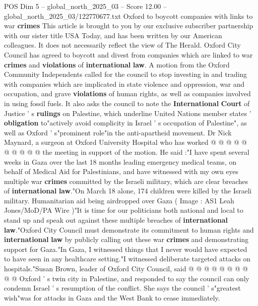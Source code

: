 \begin{textsample}{POS Dim 5 – global\_north\_2025\_03 – Score 12.00 – global\_north\_2025\_03/122770677.txt}  \label{ex:f5_pos_209}
Oxford to boycott companies with links to war \textbf{crimes} This article is brought to you by our exclusive subscriber partnership with our sister title USA Today, and has been written by our American colleagues.
It does not necessarily reflect the view of The Herald.
Oxford City Council has agreed to boycott and divest from companies which are linked to war \textbf{crimes} and \textbf{violations} of \textbf{international} \textbf{law}.
A motion from the Oxford Community Independents called for the council to stop investing in and trading with companies which are implicated in state violence and oppression, war and occupation, and grave \textbf{violations} of human rights, as well as companies involved in using fossil fuels.
It also asks the council to note the \textbf{International} \textbf{Court} of Justice ' s \textbf{rulings} on Palestine, which underline United Nations member states ' \textbf{obligation} to"actively avoid complicity in Israel ' s occupation of Palestine", as well as Oxford ' s"prominent role"in the anti-apartheid movement.
Dr Nick Maynard, a surgeon at Oxford University Hospital who has worked @ @ @ @ @ @ @ @ @ @ the meeting in support of the motion.
He said :"I have spent several weeks in Gaza over the last 18 months leading emergency medical teams, on behalf of Medical Aid for Palestinians, and have witnessed with my own eyes multiple war \textbf{crimes} committed by the Israeli military, which are clear breaches of \textbf{international} \textbf{law}."On March 18 alone, 174 children were killed by the Israeli military.
Humanitarian aid being airdropped over Gaza ( Image : AS1 Leah Jones/MoD/PA Wire )"It is time for our politicians both national and local to stand up and speak out against these multiple breaches of \textbf{international} \textbf{law}."Oxford City Council must demonstrate its commitment to human rights and \textbf{international} \textbf{law} by publicly calling out these war \textbf{crimes} and demonstrating support for Gaza."In Gaza, I witnessed things that I never would have expected to have seen in any healthcare setting."I witnessed deliberate targeted attacks on hospitals."Susan Brown, leader of Oxford City Council, said @ @ @ @ @ @ @ @ @ @ Oxford ' s twin city in Palestine, and responded to say the council can only condemn Israel ' s resumption of the conflict.
She says the council ' s"greatest wish"was for attacks in Gaza and the West Bank to cease immediately.

\end{textsample}
